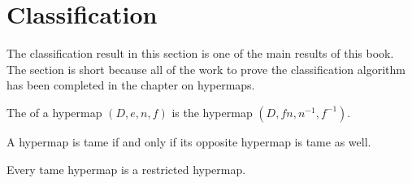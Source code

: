 
\section{Classification}
\label{sec:proof-classification}

\label{sec:classification}

The classification result in this section is one of the main results of this book.
The section is short because all of the work to prove the classification algorithm
has been completed in the chapter on hypermaps.


\begin{definition}[opposite]
The  of a hypermap $(D,e,n,f)$ is the
hypermap $(D,f n,n^{-1},f^{-1})$.
%
\end{definition}

\begin{lemma}[]
A hypermap is tame if and only if its opposite hypermap is tame as well.
\end{lemma}

\begin{lemma}[]
Every tame hypermap is a restricted hypermap.
\end{lemma}

